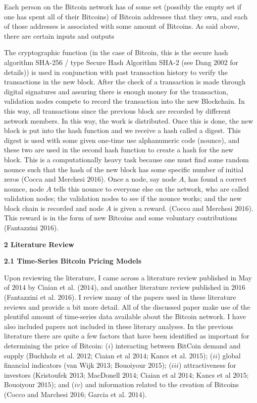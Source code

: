 \documentclass{article}[10 pt]
\newcommand{\vs}{\vspace{0.1in}}
\begin{document}
\vs

Each person on the Bitcoin network has of some set (possibly the
empty set if one has spent all of their Bitcoins) of Bitcoin addresses that
they own, and each of those addresses is associated with some amount of
Bitcoins. As said above, there are certain inputs and outputs

\vs

The cryptographic function (in the case of Bitcoin, this is the secure hash
algorithm SHA-256 / type Secure Hash Algorithm SHA-2 (see Dang $2002$ for
details)) is used in conjunction with past transaction history to verify the transactions
in the new block. After the check of a transaction is made through digital
signatures and assuring there is enough money for the transaction,
validation nodes compete to record the transaction into the new Blockchain.
In this way, all transactions since the previous block are recorded by
different network members. In this way, the work is distributed. 
Once this is done, the new block is put into the
hash function and we receive a hash called a digest. This digest is used
with some given one-time use alphanumeric code (nounce), and these two are
used in the second hash function to create a hash for the new block. This is
a computationally heavy task because one must find some random nounce such
that the hash of the new block has some specific number of initial zeros
(Cocca and Merchesi $2016$). Once a node, say node $A$, has found a correct 
nounce, node $A$ tells this nounce to everyone else on the network, who are 
called validation nodes; the validation nodes to see if the nounce works; and 
the new block chain is recorded and node $A$ is given a reward. 
(Cocco and Merchesi $2016$). This reward is in the form of new Bitcoins and 
some voluntary contributions (Fantazzini $2016$).  

\vs

\textbf{2 Literature Review}

\vs

\textbf{2.1 Time-Series Bitcoin Pricing Models}

\vs

Upon reviewing the literature, I came across a literature review published
in May of $2014$ by Ciaian et al. ($2014$), and another literature review
published in $2016$ (Fantazzini et al. $2016$). I review many of the papers
used in these literature reviews and provide a bit more detail. All of the
discussed paper make use of the plentiful amount of time-series data
available about the Bitcoin network. I have also
included papers not included in these literary analyses. In the previous
literature there are quite a few factors that have been identified as
important for determining the price of Bitcoin: ($i$) interacting between
BitCoin demand and supply (Buchholz et al. $2012$; Ciaian et al $2014$;
Kancs et al. $2015$);
($ii$) global financial indicators (van Wijk $2013$; Bouoiyour $2015$); ($iii$)
attractiveness for investors (Kristoufek $2013$; MacDonell $2014$; Ciaian et
al $2014$; Kancs et al $2015$; Bouoiyour $2015$); and ($iv$) and information
related to the creation of Bitcoins (Cocco and Marchesi $2016$; Garcia et
al. $2014$).
\end{document}
